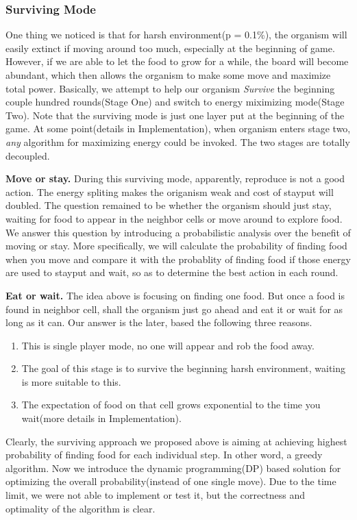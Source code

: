 \subsubsection{Surviving Mode}
One thing we noticed is that for harsh environment(p = 0.1\%), the
organism will easily extinct if moving around too much, especially at
the beginning of game.  However, if we are able to let the food to
grow for a while, the board will become abundant, which then allows
the organism to make some move and maximize total power.  Basically,
we attempt to help our organism \textit{Survive} the beginning couple
hundred rounds(Stage One) and switch to energy miximizing mode(Stage
Two). Note that the surviving mode is just one layer put at the
beginning of the game. At some point(details in Implementation), when
organism enters stage two, \textit{any} algorithm for maximizing energy could
be invoked. The two stages are totally decoupled.

\textbf{Move or stay.}  During this surviving mode, apparently,
reproduce is not a good action.  The energy spliting makes the
origanism weak and cost of stayput will doubled.  The question
remained to be whether the organism should just stay, waiting for food
to appear in the neighbor cells or move around to explore food. We
answer this question by introducing a probabilistic analysis over the
benefit of moving or stay.  More specifically, we will calculate the
probability of finding food when you move and compare it with the
probablity of finding food if those energy are used to stayput and
wait, so as to determine the best action in each round.

\textbf{Eat or wait.} The idea above is focusing on finding one food.
But once a food is found in neighbor cell, shall the organism just go
ahead and eat it or wait for as long as it can. Our answer is the
later, based the following three reasons.
\begin{enumerate}
\item This is single player mode, no one will appear and rob the food
  away.
\item The goal of this stage is to survive the beginning harsh
  environment, waiting is more suitable to this.
\item The expectation of food on that cell grows exponential to the
  time you wait(more details in Implementation).
\end{enumerate}

Clearly, the surviving approach we proposed above is aiming at
achieving highest probability of finding food for each individual
step.  In other word, a greedy algorithm.  Now we introduce the
dynamic programming(DP) based solution for optimizing the overall
probability(instead of one single move). Due to the time limit,
we were not able to implement or test it, but the correctness 
and optimality of the algorithm is clear.

